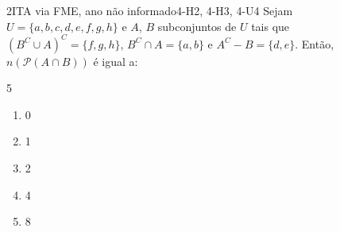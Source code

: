 \begin{questao}{2}{ITA via FME, ano não informado}{4-H2, 4-H3, 4-U4}\label{u4:ita43}
Sejam $U=\{a,b,c,d,e,f,g,h\}$ e $A$, $B$ subconjuntos de $U$ tais que $(B^{C}\cup A)^{C}=\{f,g,h\}$, $B^{C}\cap A=\{a,b\}$ e $A^{C}-B=\{d,e\}$. Então, $n(\mathcal{P}(A\cap B))$ é igual a:
\begin{multicols}{5}
\begin{enumerate}[label=\alph*)]
  \item 0
  \item 1
  \item 2
  \item 4
  \item 8
\end{enumerate}
\end{multicols}
\end{questao}

